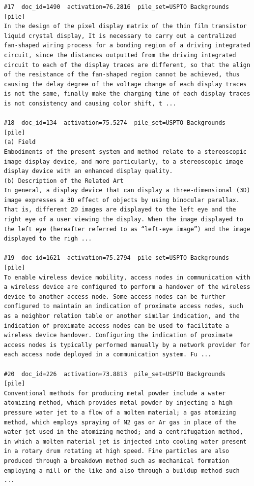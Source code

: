 \begin{verbatim}
#17  doc_id=1490  activation=76.2816  pile_set=USPTO Backgrounds  [pile]
In the design of the pixel display matrix of the thin film transistor liquid crystal display, It is necessary to carry out a centralized fan-shaped wiring process for a bonding region of a driving integrated circuit, since the distances outputted from the driving integrated circuit to each of the display traces are different, so that the align of the resistance of the fan-shaped region cannot be achieved, thus causing the delay degree of the voltage change of each display traces is not the same, finally make the charging time of each display traces is not consistency and causing color shift, t ...

#18  doc_id=134  activation=75.5274  pile_set=USPTO Backgrounds  [pile]
(a) Field
Embodiments of the present system and method relate to a stereoscopic image display device, and more particularly, to a stereoscopic image display device with an enhanced display quality.
(b) Description of the Related Art
In general, a display device that can display a three-dimensional (3D) image expresses a 3D effect of objects by using binocular parallax. That is, different 2D images are displayed to the left eye and the right eye of a user viewing the display. When the image displayed to the left eye (hereafter referred to as “left-eye image”) and the image displayed to the righ ...

#19  doc_id=1621  activation=75.2794  pile_set=USPTO Backgrounds  [pile]
To enable wireless device mobility, access nodes in communication with a wireless device are configured to perform a handover of the wireless device to another access node. Some access nodes can be further configured to maintain an indication of proximate access nodes, such as a neighbor relation table or another similar indication, and the indication of proximate access nodes can be used to facilitate a wireless device handover. Configuring the indication of proximate access nodes is typically performed manually by a network provider for each access node deployed in a communication system. Fu ...

#20  doc_id=226  activation=73.8813  pile_set=USPTO Backgrounds  [pile]
Conventional methods for producing metal powder include a water atomizing method, which provides metal powder by injecting a high pressure water jet to a flow of a molten material; a gas atomizing method, which employs spraying of N2 gas or Ar gas in place of the water jet used in the atomizing method; and a centrifugation method, in which a molten material jet is injected into cooling water present in a rotary drum rotating at high speed. Fine particles are also produced through a breakdown method such as mechanical formation employing a mill or the like and also through a buildup method such ...

\end{verbatim}

